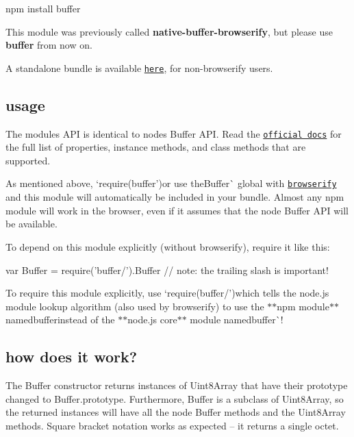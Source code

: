 \begin{DoxyCode}
npm install buffer
\end{DoxyCode}


This module was previously called {\bfseries native-\/buffer-\/browserify}, but please use {\bfseries buffer} from now on.

A standalone bundle is available \href{https://wzrd.in/standalone/buffer}{\tt here}, for non-\/browserify users.

\subsection*{usage}

The module\textquotesingle{}s A\+PI is identical to node\textquotesingle{}s {\ttfamily Buffer} A\+PI. Read the \href{https://nodejs.org/api/buffer.html}{\tt official docs} for the full list of properties, instance methods, and class methods that are supported.

As mentioned above, `require(\textquotesingle{}buffer'){\ttfamily or use the}Buffer\`{} global with \href{http://browserify.org}{\tt browserify} and this module will automatically be included in your bundle. Almost any npm module will work in the browser, even if it assumes that the node {\ttfamily Buffer} A\+PI will be available.

To depend on this module explicitly (without browserify), require it like this\+:


\begin{DoxyCode}
var Buffer = require('buffer/').Buffer  // note: the trailing slash is important!
\end{DoxyCode}


To require this module explicitly, use `require(\textquotesingle{}buffer/'){\ttfamily which tells the node.\+js module lookup algorithm (also used by browserify) to use the $\ast$$\ast$npm module$\ast$$\ast$ named}buffer{\ttfamily  instead of the $\ast$$\ast$node.js core$\ast$$\ast$ module named}buffer\`{}!

\subsection*{how does it work?}

The Buffer constructor returns instances of {\ttfamily Uint8\+Array} that have their prototype changed to {\ttfamily Buffer.\+prototype}. Furthermore, {\ttfamily Buffer} is a subclass of {\ttfamily Uint8\+Array}, so the returned instances will have all the node {\ttfamily Buffer} methods and the {\ttfamily Uint8\+Array} methods. Square bracket notation works as expected -- it returns a single octet.

